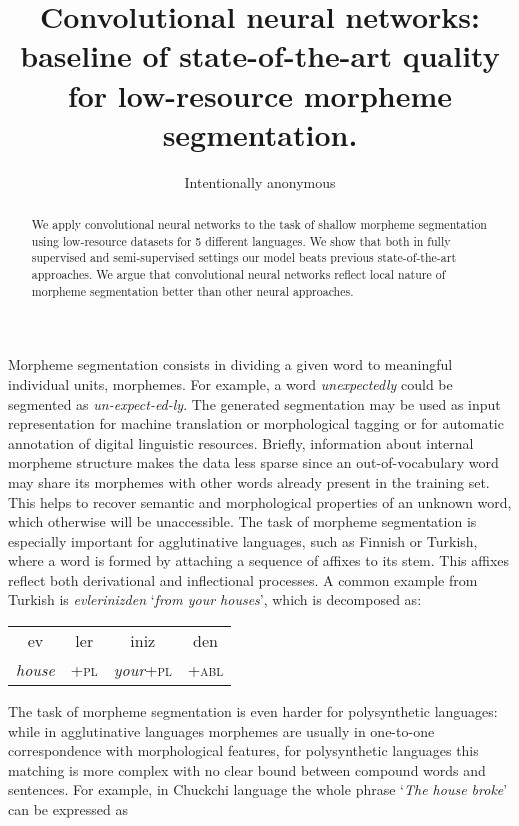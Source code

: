 \documentclass[11pt,a4paper]{article}
\title{Convolutional neural networks: baseline of state-of-the-art quality for low-resource morpheme segmentation.}
\author{Intentionally anonymous}
\date{}
\begin{document}
\maketitle
\begin{abstract}
  We apply convolutional neural networks to the task of shallow morpheme segmentation using low-resource datasets for 5 different languages. We show that both in fully supervised and semi-supervised settings our model beats previous state-of-the-art approaches. We argue that convolutional neural networks reflect local nature of morpheme segmentation better than other neural approaches.
\end{abstract}

Morpheme segmentation consists in dividing a given word to meaningful individual units, morphemes. For example, a word \textit{unexpectedly} could be segmented as \textit{un-expect-ed-ly}. The generated segmentation may be used as input representation for machine translation  or morphological tagging  or for automatic annotation of digital linguistic resources. Briefly, information about internal morpheme structure makes the data less sparse since an out-of-vocabulary word may share its morphemes with other words already present in the training set. This helps to recover semantic and morphological properties of an unknown word, which otherwise will be unaccessible. The task of morpheme segmentation is especially important for agglutinative languages, such as Finnish or Turkish, where a word is formed by attaching a sequence of affixes to its stem. This affixes reflect both derivational and inflectional processes. A common example from Turkish is \textit{evlerinizden} `\textit{from your houses}', which is decomposed as: 

\begin{center}
	\begin{tabular}{cccc}
		ev & ler & iniz & den \\
		\textit{house} & \textsc{+pl} & \textit{your}\textsc{+pl} & \textsc{+abl}
	\end{tabular}
\end{center}

The task of morpheme segmentation is even harder for polysynthetic languages: while in agglutinative languages morphemes are usually in one-to-one correspondence with morphological features, for polysynthetic languages this matching is more complex with no clear bound between compound words and sentences. For example, in Chuckchi language the whole phrase `\textit{The house broke}' can be expressed as
\end{document}
